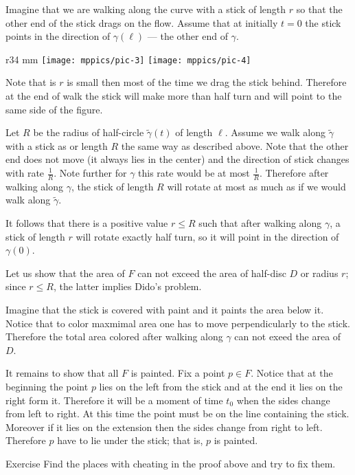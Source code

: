 Imagine that we are walking along the curve with a stick of length $r$ so that the other end of the stick drags on the flow.
Assume that at initially $t=0$ the stick points in the direction of $\gamma(\ell)$ --- the other end of $\gamma$.

\begin{wrapfigure}{r}{34 mm}
\vskip-0mm
\centering
\texttt{[image: mppics/pic-3]}
\bigskip
\texttt{[image: mppics/pic-4]}
\end{wrapfigure}

Note that is $r$ is small then most of the time we drag the stick behind. Therefore at the end of walk the stick will make more than half turn and will point to the same side of the figure.

Let $R$ be the radius of half-circle $\tilde\gamma(t)$ of length $\ell$.
Assume we walk along $\tilde\gamma$  with a stick as or length $R$ the same way as described above.
Note that the other end does not move (it always lies in the center) and the direction of stick changes with rate $\tfrac1R$.
Note further for $\gamma$ this rate would be at most $\tfrac1R$.
Therefore after walking along $\gamma$,
the stick of length $R$ will rotate at most as much as if we would walk along $\tilde\gamma$.

It follows that there is a positive value $r\le R$ such that after walking along $\gamma$, a stick of length $r$ will rotate exactly half turn, so it will point in the direction of $\gamma(0)$.

Let us show that the area of $F$ can not exceed the area of half-disc $D$ or radius $r$;
since $r\le R$, the latter implies Dido's problem.

Imagine that the stick is covered with paint and it paints the area below it.
Notice that to color maxmimal area one has to move perpendicularly to the stick.
Therefore the total area colored after walking along $\gamma$ can not exeed the area of $D$.

It remains to show that all $F$ is painted.
Fix a point $p\in F$.
Notice that at the beginning the point $p$ lies on the left from the stick and at the end it lies on the right form it.
Therefore it will be a moment of time $t_0$ when the sides change from left to right.
At this time the point must be on the line containing the stick. 
Moreover if it lies on the extension then the sides change from right to left. Therefore $p$ have to lie under the stick; that is, $p$ is painted.
\qeds

\begin{thm}{Exercise}
Find the places with cheating in the proof above and try to fix them.
\end{thm}

